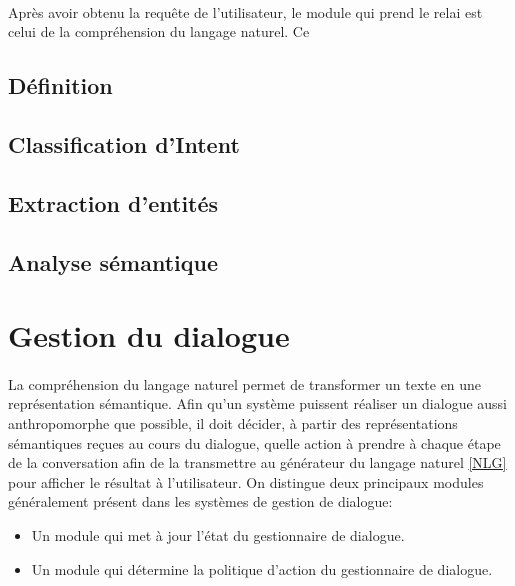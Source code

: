 	\paragraph{}
	Après avoir obtenu la requête de l'utilisateur, le module qui prend le relai est celui de la compréhension du langage naturel. Ce  
	\subsection{Définition}
		\paragraph{}
	\subsection{Classification d'Intent}
		\paragraph{}
	\subsection{Extraction d'entités}
		\paragraph{}
	\subsection{Analyse sémantique}

\section{Gestion du dialogue}
	\paragraph{}
	La compréhension du langage naturel permet de transformer un texte en une représentation sémantique. Afin qu’un système puissent réaliser un dialogue aussi anthropomorphe que possible, il doit décider, à partir des représentations sémantiques reçues au cours du dialogue, quelle action à prendre à chaque étape de la conversation afin de la transmettre au générateur du langage naturel \ref{NLG} pour afficher le résultat à l’utilisateur. On distingue deux principaux modules généralement présent dans les systèmes de gestion de dialogue:
\begin{itemize}
	\item Un module qui met à jour l’état du gestionnaire de dialogue.
	\item Un module qui détermine la politique d’action du gestionnaire de dialogue.
\end{itemize}

